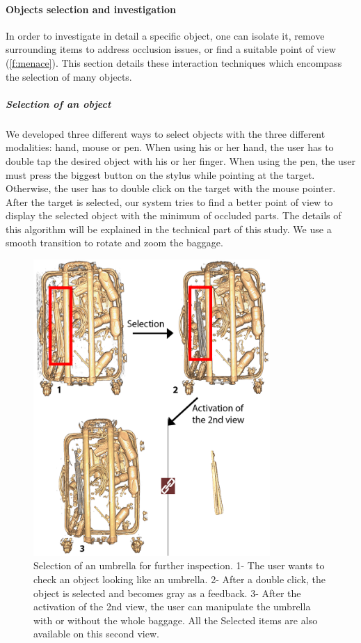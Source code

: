 \paragraph{ Objects selection and investigation}
In order to investigate in detail a specific object, one can isolate it, remove surrounding items to address occlusion issues, or find a suitable point of view (\autoref{f:menace}). This section details these interaction techniques which encompass the selection of  many objects.


\subparagraph{	Selection of an object}
We developed three different ways to select objects with the three different modalities: hand, mouse or pen. When using his or her hand, the user has to double tap the desired object with his or her finger. When using the pen, the user must press the biggest button on the stylus while pointing at the target. Otherwise, the user has to double click on the target with the mouse pointer. After the target is selected, our system tries to find a better point of view to display the selected object with the minimum of occluded parts. The details of this algorithm will be explained in the technical part of this study. We use a smooth transition to rotate and zoom the baggage. 


\begin{figure}
\centering   
	\includegraphics[width=9cm]{Figures/selection.png}
	\caption{ Selection of an umbrella for further inspection.  1- The user wants to check an object looking like an umbrella. 2- After a double click, the object is selected and becomes gray as a feedback. 3- After the activation of the 2nd view, the user can manipulate the umbrella with or without the whole baggage. All the Selected items are also available on this second view. }
	\label{f:selection}
\end{figure}




